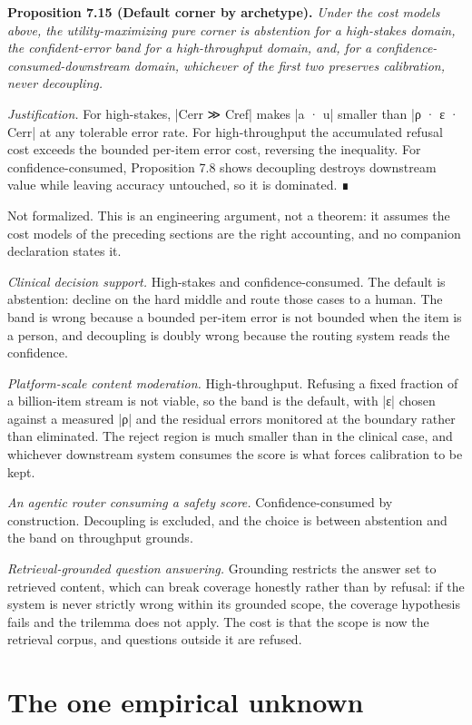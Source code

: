 \documentclass{memoir}
\begin{document}
\textbf{Proposition 7.15 (Default corner by archetype).} \emph{Under the cost models above, the
utility-maximizing pure corner is abstention for a high-stakes domain, the
confident-error band for a high-throughput domain, and, for a
confidence-consumed-downstream domain, whichever of the first two preserves
calibration, never decoupling.}

\emph{Justification.} For high-stakes, \LeanVerb|Cerr ≫ Cref| makes \LeanVerb|a · u| smaller than \LeanVerb|ρ · ε · Cerr|
at any tolerable error rate. For high-throughput the accumulated refusal cost
exceeds the bounded per-item error cost, reversing the inequality. For
confidence-consumed, Proposition 7.8 shows decoupling destroys downstream value
while leaving accuracy untouched, so it is dominated. ∎

Not formalized. This is an engineering argument, not a theorem: it assumes the
cost models of the preceding sections are the right accounting, and no companion
declaration states it.

\emph{Clinical decision support.} High-stakes and confidence-consumed. The default is
abstention: decline on the hard middle and route those cases to a human. The
band is wrong because a bounded per-item error is not bounded when the item is a
person, and decoupling is doubly wrong because the routing system reads the
confidence.

\emph{Platform-scale content moderation.} High-throughput. Refusing a fixed fraction
of a billion-item stream is not viable, so the band is the default, with \LeanVerb|ε|
chosen against a measured \LeanVerb|ρ| and the residual errors monitored at the boundary
rather than eliminated. The reject region is much smaller than in the clinical
case, and whichever downstream system consumes the score is what forces
calibration to be kept.

\emph{An agentic router consuming a safety score.} Confidence-consumed by
construction. Decoupling is excluded, and the choice is between abstention and
the band on throughput grounds.

\emph{Retrieval-grounded question answering.} Grounding restricts the answer set to
retrieved content, which can break coverage honestly rather than by refusal: if
the system is never strictly wrong within its grounded scope, the coverage
hypothesis fails and the trilemma does not apply. The cost is that the scope is
now the retrieval corpus, and questions outside it are refused.



\section{The one empirical unknown}\label{Two--Schemas--of--Impossibility-005F-005F-005F--Machine--Checked--Limits--of--Trustworthy--Machine--Learning-005F-005F-005F--and--Why--They--Tighten--with--Capability----What--It--Means--for--AI--Safety----The--one--empirical--unknown}
\end{document}
